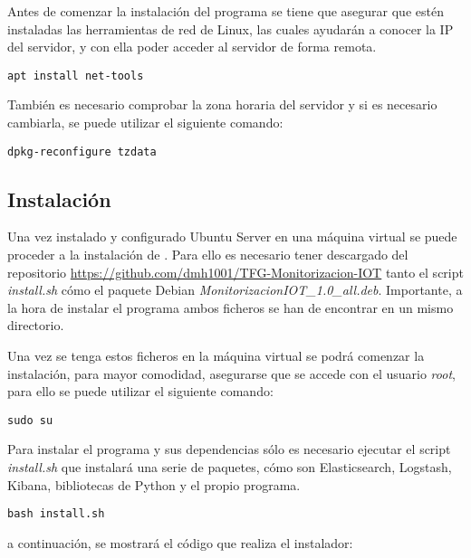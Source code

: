 Antes de comenzar la instalación del programa se tiene que asegurar que estén instaladas las herramientas de red de Linux, las cuales ayudarán a conocer la IP del servidor, y con ella poder acceder al servidor de forma remota.


\begin{lstlisting}[frame=single] 
apt install net-tools
\end{lstlisting}

También es necesario comprobar la zona horaria del servidor y si es necesario cambiarla, se puede utilizar el siguiente comando:


\begin{lstlisting}[frame=single] 
dpkg-reconfigure tzdata
\end{lstlisting}

\subsection{Instalación \nombrePrograma}

Una vez instalado y configurado Ubuntu Server en una máquina virtual se puede proceder a la instalación de \nombrePrograma. Para ello es necesario tener descargado del repositorio \url{https://github.com/dmh1001/TFG-Monitorizacion-IOT} tanto el script \textit{install.sh} cómo el paquete Debian \textit{MonitorizacionIOT\_1.0\_all.deb}. Importante, a la hora de instalar el programa ambos ficheros se han de encontrar en un mismo directorio. 

Una vez se tenga estos ficheros en la máquina virtual se podrá comenzar la instalación, para mayor comodidad, asegurarse que se accede con el usuario \textit{root}, para ello se puede utilizar el siguiente comando:

\begin{lstlisting}[frame=single] 
sudo su
\end{lstlisting}

Para instalar el programa y sus dependencias sólo es necesario ejecutar el script \textit{install.sh} que instalará una serie de paquetes, cómo son Elasticsearch, Logstash, Kibana, bibliotecas de Python y el propio programa. 

\begin{lstlisting}[frame=single] 
bash install.sh
\end{lstlisting}

a continuación, se mostrará el código que realiza el instalador:

